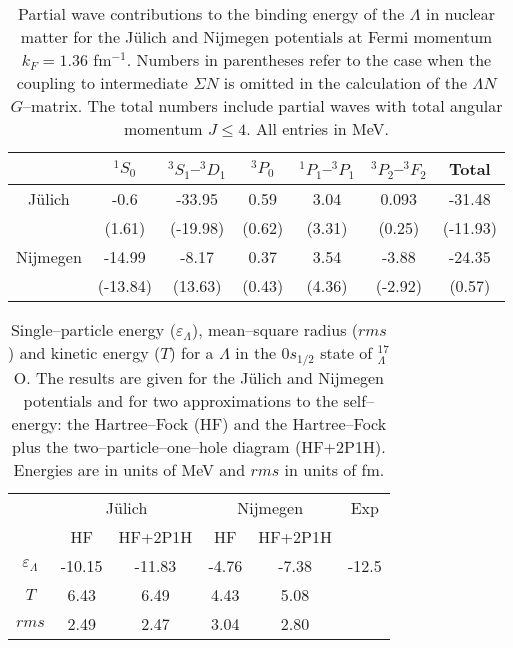 

\begin{table}
\begin{center}
\caption{Partial wave contributions to the
binding energy of the $\Lambda$ in nuclear matter for the J\"{u}lich and
Nijmegen potentials at Fermi momentum $k_F=1.36$ fm$^{-1}$.
Numbers in parentheses refer to the case
when the coupling to intermediate $\Sigma N$ is omitted in the calculation of
the $\Lambda N$ $G$--matrix. The total numbers include partial waves
with total angular momentum $J\leq 4$.
All entries in MeV.}
\begin{tabular}{ccccccc}\hline
& $^1S_0$ & $^3S_1$--$^3D_1$ & $^3P_0$ & $^1P_1$--$^3P_1$ & $^3P_2$--$^3F_2$&
Total\\\hline
J\"ulich & -0.6 & -33.95&0.59&3.04&0.093&-31.48 \\
         & (1.61) & (-19.98) & (0.62) & (3.31) & (0.25) & (-11.93) \\

Nijmegen & -14.99 & -8.17 & 0.37 & 3.54 & -3.88 & -24.35 \\
         & (-13.84) & (13.63) & (0.43) & (4.36) & (-2.92) & (0.57) \\
         \hline
\end{tabular}
\end{center}
\label{tab:tab1}
\end{table}


\begin{table}
\begin{center}
\caption{Single--particle energy ($\varepsilon_{\Lambda}$),
mean--square radius ($rms$) and kinetic energy ($T$)
for a $\Lambda$ in the $0s_{1/2}$ state
of $^{17}_{\Lambda}$O.
The results are given for the J\"ulich and Nijmegen potentials and for two
approximations to the self--energy: the 
Hartree--Fock (HF) and the Hartree--Fock
plus the two--particle--one--hole diagram (HF+2P1H).
Energies are in units of MeV and $rms$ in units of fm.}
\begin{tabular}{cccccc}\hline
&\multicolumn{2}{c}{J\"ulich}&\multicolumn{2}{c}{Nijmegen}&Exp\\
&HF&HF+2P1H&HF&HF+2P1H&\\\hline
$\varepsilon_{\Lambda}$&-10.15&-11.83&-4.76&-7.38&-12.5  \cite{bando3}\\
$T$& 6.43&6.49 &4.43&5.08&\\
$rms$&2.49&2.47&3.04&2.80&\\\hline
\end{tabular}
\end{center}
\label{tab:tab2}
\end{table}







